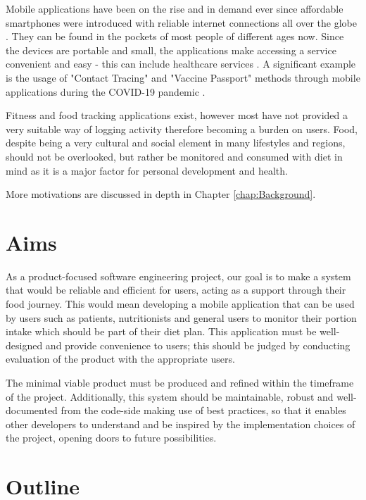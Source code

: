 \documentclass[../main.tex]{subfiles}
\begin{document}
Mobile applications have been on the rise and in demand ever since affordable smartphones were introduced with reliable internet connections all over the globe \cite{phamResearchAppStore2018a,venturebeatStudyMobileApp2012,comscoreMobileMarketSamsung}. They can be found in the pockets of most people of different ages now. Since the devices are portable and small, the applications make accessing a service convenient and easy \cite{bohmerFallingAsleepAngry2011a} - this can include healthcare services \cite{ventolaMobileDevicesApps2014a}. A significant example is the usage of "Contact Tracing" and "Vaccine Passport" methods through mobile applications during the COVID-19 pandemic \cite{COVID19App2022,NHSCOVID19App}.

Fitness and food tracking applications exist, however most have not provided a very suitable way of logging activity therefore becoming a burden on users. Food, despite being a very cultural and social element in many lifestyles and regions, should not be overlooked, but rather be monitored and consumed with diet in mind as it is a major factor for personal development and health.

More motivations are discussed in depth in Chapter \ref{chap:Background}.

\section{Aims}

As a product-focused software engineering project, our goal is to make a system that would be reliable and efficient for users, acting as a support through their food journey. This would mean developing a mobile application that can be used by users such as patients, nutritionists and general users to monitor their portion intake which should be part of their diet plan. This application must be well-designed and provide convenience to users; this should be judged by conducting evaluation of the product with the appropriate users.

The minimal viable product must be produced and refined within the timeframe of the project. Additionally, this system should be maintainable, robust and well-documented from the code-side making use of best practices, so that it enables other developers to understand and be inspired by the implementation choices of the project, opening doors to future possibilities.

\section{Outline}
\end{document}
